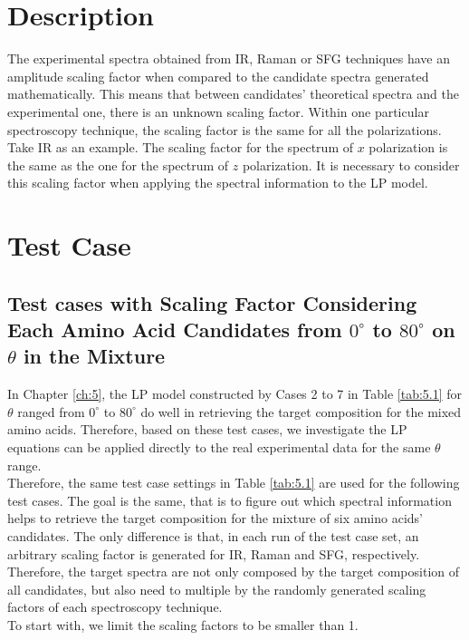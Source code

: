  \label{ch:6}
\section{Description}
The experimental spectra obtained from IR, Raman or SFG techniques have an amplitude scaling factor when compared to the candidate spectra generated mathematically. This means that between candidates' theoretical spectra and the experimental one, there is an unknown scaling factor. Within one particular spectroscopy technique, the scaling factor is the same for all the polarizations. Take IR as an example. The scaling factor for the spectrum of $x$ polarization is the same as the one for the spectrum of $z$ polarization. It is necessary to consider this scaling factor when applying the spectral information to the LP model. \\

\section{Test Case}
\subsection{Test cases with Scaling Factor Considering Each Amino Acid Candidates from $0^{\circ}$ to $80^{\circ}$ on $\theta$ in the Mixture}
In Chapter \ref{ch:5}, the LP model constructed by Cases 2 to 7 in Table \ref{tab:5.1} for $\theta$ ranged from $0^{\circ}$ to $80^{\circ}$ do well in retrieving the target composition for the mixed amino acids. Therefore, based on these test cases, we investigate the LP equations can be applied directly to the real experimental data for the same $\theta$ range.\\

Therefore, the same test case settings in Table \ref{tab:5.1} are used for the following test cases. The goal is the same, that is to figure out which spectral information helps to retrieve the target composition for the mixture of six amino acids' candidates. The only difference is that, in each run of the test case set, an arbitrary scaling factor is generated for IR, Raman and SFG, respectively. Therefore, the target spectra are not only composed by the target composition of all candidates, but also need to multiple by the randomly generated scaling factors of each spectroscopy technique. \\

To start with, we limit the scaling factors to be smaller than 1. \\

